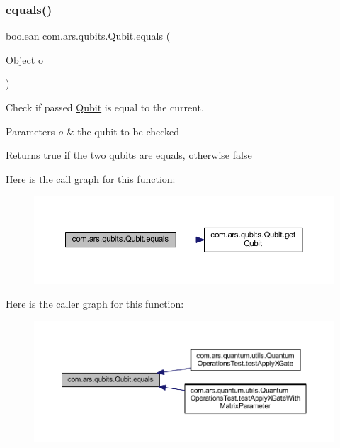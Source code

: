 \subsubsection{\texorpdfstring{equals()}{equals()}}
{\footnotesize\ttfamily boolean com.\+ars.\+qubits.\+Qubit.\+equals (\begin{DoxyParamCaption}\item[{Object}]{o }\end{DoxyParamCaption})}

Check if passed {\ttfamily \hyperlink{classcom_1_1ars_1_1qubits_1_1_qubit}{Qubit}} is equal to the current. 
\begin{DoxyParams}{Parameters}
{\em o} & the qubit to be checked \\
\hline
\end{DoxyParams}
\begin{DoxyReturn}{Returns}
true if the two qubits are equals, otherwise false 
\end{DoxyReturn}
Here is the call graph for this function\+:\nopagebreak
\begin{figure}[H]
\begin{center}
\leavevmode
\includegraphics[width=350pt]{classcom_1_1ars_1_1qubits_1_1_qubit_a2070492aa6a39ee06855fdd94566e4d3_cgraph}
\end{center}
\end{figure}
Here is the caller graph for this function\+:\nopagebreak
\begin{figure}[H]
\begin{center}
\leavevmode
\includegraphics[width=350pt]{classcom_1_1ars_1_1qubits_1_1_qubit_a2070492aa6a39ee06855fdd94566e4d3_icgraph}
\end{center}
\end{figure}
\hypertarget{classcom_1_1ars_1_1qubits_1_1_qubit_a48b2de0bf6b0efc8470d687a239085db}{}\label{classcom_1_1ars_1_1qubits_1_1_qubit_a48b2de0bf6b0efc8470d687a239085db} 
